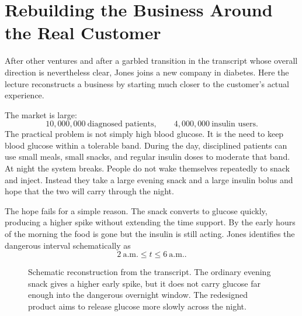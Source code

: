 \section{Rebuilding the Business Around the Real Customer}

After other ventures and after a garbled transition in the transcript whose overall direction is nevertheless clear, Jones joins a new company in diabetes. Here the lecture reconstructs a business by starting much closer to the customer's actual experience.

The market is large:
\begin{equation}
10{,}000{,}000\ \text{diagnosed patients},
\qquad
4{,}000{,}000\ \text{insulin users}.
\end{equation}
The practical problem is not simply high blood glucose. It is the need to keep blood glucose within a tolerable band. During the day, disciplined patients can use small meals, small snacks, and regular insulin doses to moderate that band. At night the system breaks. People do not wake themselves repeatedly to snack and inject. Instead they take a large evening snack and a large insulin bolus and hope that the two will carry through the night.

The hope fails for a simple reason. The snack converts to glucose quickly, producing a higher spike without extending the time support. By the early hours of the morning the food is gone but the insulin is still acting. Jones identifies the dangerous interval schematically as
\begin{equation}
2\ \text{a.m.} \le t \le 6\ \text{a.m.}.
\end{equation}

\begin{figure}
\centering
{}
\caption{Schematic reconstruction from the transcript. The ordinary evening snack gives a higher early spike, but it does not carry glucose far enough into the dangerous overnight window. The redesigned product aims to release glucose more slowly across the night.}
\end{figure}

